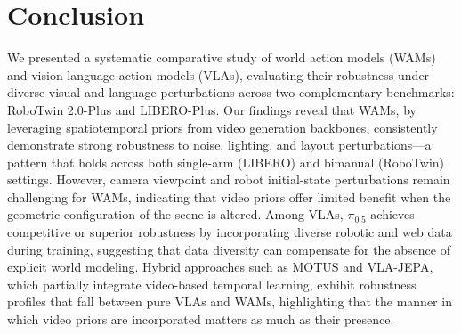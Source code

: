 \documentclass{article}
\begin{document}


\section{Conclusion}

We presented a systematic comparative study of world action models (WAMs) and vision-language-action models (VLAs), evaluating their robustness under diverse visual and language perturbations across two complementary benchmarks: RoboTwin 2.0-Plus and LIBERO-Plus. Our findings reveal that WAMs, by leveraging spatiotemporal priors from video generation backbones, consistently demonstrate strong robustness to noise, lighting, and layout perturbations---a pattern that holds across both single-arm (LIBERO) and bimanual (RoboTwin) settings. However, camera viewpoint and robot initial-state perturbations remain challenging for WAMs, indicating that video priors offer limited benefit when the geometric configuration of the scene is altered. Among VLAs, $\pi_{0.5}$ achieves competitive or superior robustness by incorporating diverse robotic and web data during training, suggesting that data diversity can compensate for the absence of explicit world modeling. Hybrid approaches such as MOTUS and VLA-JEPA, which partially integrate video-based temporal learning, exhibit robustness profiles that fall between pure VLAs and WAMs, highlighting that the manner in which video priors are incorporated matters as much as their presence.
\end{document}
